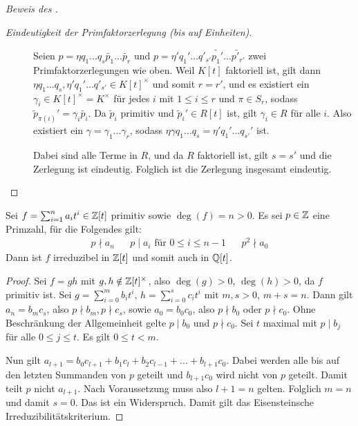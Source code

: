\documentclass[12pt,a4paper]{scrartcl}
\begin{document}
\begin{proof}[Beweis des ]
\begin{description}
		\item[\emph{Eindeutigkeit der Primfaktorzerlegung (bis auf Einheiten).}] Seien $p = \eta q_1\dots q_s\tilde {p_1}\dots \tilde{p_r}$ und $p = \eta'q_1'\dots q'_{s'}\tilde{p_1'}\dots\tilde{p'_{r'}}$ zwei Primfaktorzerlegungen wie oben.
		Weil $K[t]$ faktoriell ist, gilt dann $\eta q_1\dots q_s,\eta'q_1 '\dots q'_{s'}\in K[t]^{\times}$ und somit $r = r'$, und es existiert ein $\gamma_i\in K[t]^{\times} =K^{\times}$ für jedes $i$ mit $1\leq i \leq r$ und $\pi\in S_r$, sodass $\tilde p_{\pi(i)}' = \gamma_i\tilde{p_i}$. Da $\tilde p_i$ primitiv und $\tilde p_i'\in R[t]$ ist, gilt $\gamma_i\in R$ für alle $i$. Also existiert ein $\gamma = \gamma_1\dots \gamma_r$, sodass $\eta\gamma{q_1}\dots {q_s} = \eta'{q_1'}\dots {q_{s'}'}$ ist.
		
		Dabei sind alle Terme in $R$, und da $R$ faktoriell ist, gilt $s = s'$ und die Zerlegung ist \glqq eindeutig\grqq. Folglich ist die Zerlegung insgesamt \glqq eindeutig\grqq.
	\end{description}
\end{proof}

\begin{satz} \label{thm:eisenstein}
	Sei $f = \sum_{i = 1}^n a_it^i\in\mathbb Z[t]$ primitiv sowie $\deg (f) = n>0$. Es sei $p\in \mathbb Z$ eine Primzahl, für die Folgendes gilt: \begin{align*}
		p \nmid a_n && \text{$p \mid a_i$ für $0 \le i \le n-1$} && p^2 \nmid a_0 
	\end{align*}
	Dann ist $f$ irreduzibel in $\mathbb Z[t]$ und somit auch in $\mathbb Q[t]$.
\end{satz}

\begin{proof}
	Sei $f = gh$ mit $g, h\notin \mathbb Z[t]^{\times}$, also $\deg(g)>0$, $\deg(h)>0$, da $f$ primitiv ist. Sei $g = \sum_{i = 0}^mb_it^i$, $h = \sum_{i = 0}^sc_it^i$ mit $m,s>0$, $m+s = n$. Dann gilt $a_n = b_mc_s$, also $p\nmid b_m, p\nmid c_s$, sowie $a_0 = b_0c_0$, also $p\nmid b_0$ oder $p\nmid c_0$. Ohne Beschränkung der Allgemeinheit gelte $p\mid b_0$ und $p\nmid c_0$. Sei $t$ maximal mit $p\mid b_j$ für alle $0\leq j\leq t$. Es gilt $0\leq t < m$.
	
	Nun gilt $a_{l+1} = b_0c_{l+1} +b_1c_l +b_2c_{l-1}+\dots +b_{l+1}c_0$. Dabei werden alle bis auf den letzten Summanden von $p$ geteilt und $b_{l+1}c_0$ wird nicht von $p$ geteilt. Damit teilt $p$ nicht $a_{l+1}$. Nach Voraussetzung muss also $l+1 = n$ gelten. Folglich $m = n$ und damit $s = 0$. Das ist ein Widerspruch. Damit gilt das Eisensteinsche Irreduzibilitätskriterium.
\end{proof}
\end{document}
